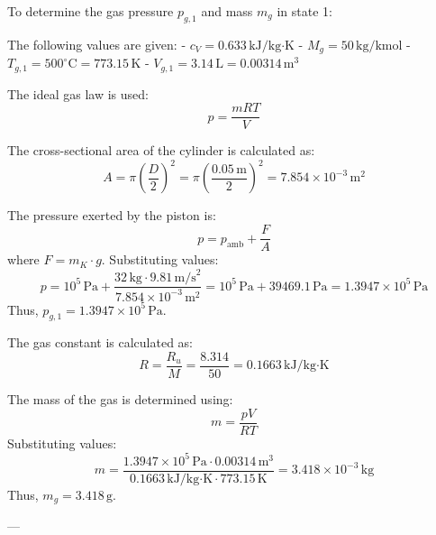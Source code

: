 To determine the gas pressure \( p_{g,1} \) and mass \( m_g \) in state 1:  

The following values are given:  
- \( c_V = 0.633 \, \text{kJ/kg·K} \)  
- \( M_g = 50 \, \text{kg/kmol} \)  
- \( T_{g,1} = 500^\circ\text{C} = 773.15 \, \text{K} \)  
- \( V_{g,1} = 3.14 \, \text{L} = 0.00314 \, \text{m}^3 \)  

The ideal gas law is used:  
\[
p = \frac{mRT}{V}
\]  

The cross-sectional area of the cylinder is calculated as:  
\[
A = \pi \left(\frac{D}{2}\right)^2 = \pi \left(\frac{0.05 \, \text{m}}{2}\right)^2 = 7.854 \times 10^{-3} \, \text{m}^2
\]  

The pressure exerted by the piston is:  
\[
p = p_{\text{amb}} + \frac{F}{A}
\]  
where \( F = m_K \cdot g \). Substituting values:  
\[
p = 10^5 \, \text{Pa} + \frac{32 \, \text{kg} \cdot 9.81 \, \text{m/s}^2}{7.854 \times 10^{-3} \, \text{m}^2} = 10^5 \, \text{Pa} + 39469.1 \, \text{Pa} = 1.3947 \times 10^5 \, \text{Pa}
\]  
Thus, \( p_{g,1} = 1.3947 \times 10^5 \, \text{Pa} \).  

The gas constant is calculated as:  
\[
R = \frac{R_u}{M} = \frac{8.314}{50} = 0.1663 \, \text{kJ/kg·K}
\]  

The mass of the gas is determined using:  
\[
m = \frac{pV}{RT}
\]  
Substituting values:  
\[
m = \frac{1.3947 \times 10^5 \, \text{Pa} \cdot 0.00314 \, \text{m}^3}{0.1663 \, \text{kJ/kg·K} \cdot 773.15 \, \text{K}} = 3.418 \times 10^{-3} \, \text{kg}
\]  
Thus, \( m_g = 3.418 \, \text{g} \).  

---